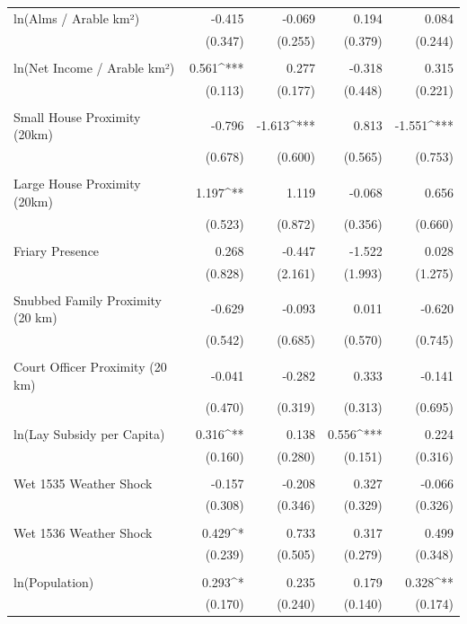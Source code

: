 \begin{table}[H]
\begin{tabular}{@{\extracolsep{.5pt}}lD{.}{.}{-3} D{.}{.}{-3} D{.}{.}{-3} D{.}{.}{-3} }
 ln(Alms / Arable km²) & -0.415 & -0.069 & 0.194 & 0.084 \\ 
  & (0.347) & (0.255) & (0.379) & (0.244) \\ 
  & & & & \\ 
 ln(Net Income / Arable km²) & 0.561^{***} & 0.277 & -0.318 & 0.315 \\ 
  & (0.113) & (0.177) & (0.448) & (0.221) \\ 
  & & & & \\ 
 Small House Proximity (20km) & -0.796 & -1.613^{***} & 0.813 & -1.551^{***} \\ 
  & (0.678) & (0.600) & (0.565) & (0.753) \\ 
  & & & & \\ 
 Large House Proximity (20km) & 1.197^{**} & 1.119 & -0.068 & 0.656 \\ 
  & (0.523) & (0.872) & (0.356) & (0.660) \\ 
  & & & & \\ 
 Friary Presence & 0.268 & -0.447 & -1.522 & 0.028 \\ 
  & (0.828) & (2.161) & (1.993) & (1.275) \\ 
  & & & & \\ 
 Snubbed Family Proximity (20 km) & -0.629 & -0.093 & 0.011 & -0.620 \\ 
  & (0.542) & (0.685) & (0.570) & (0.745) \\ 
  & & & & \\ 
 Court Officer Proximity (20 km) & -0.041 & -0.282 & 0.333 & -0.141 \\ 
  & (0.470) & (0.319) & (0.313) & (0.695) \\ 
  & & & & \\ 
 ln(Lay Subsidy per Capita) & 0.316^{**} & 0.138 & 0.556^{***} & 0.224 \\ 
  & (0.160) & (0.280) & (0.151) & (0.316) \\ 
  & & & & \\ 
 Wet 1535 Weather Shock & -0.157 & -0.208 & 0.327 & -0.066 \\ 
  & (0.308) & (0.346) & (0.329) & (0.326) \\ 
  & & & & \\ 
 Wet 1536 Weather Shock & 0.429^{*} & 0.733 & 0.317 & 0.499 \\ 
  & (0.239) & (0.505) & (0.279) & (0.348) \\ 
  & & & & \\ 
 ln(Population) & 0.293^{*} & 0.235 & 0.179 & 0.328^{**} \\ 
  & (0.170) & (0.240) & (0.140) & (0.174) \\ 

\end{tabular}
\end{table}
